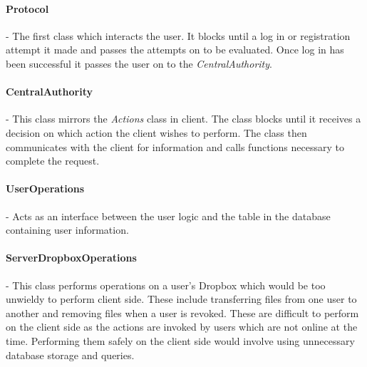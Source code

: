 \documentclass[12pt, titlepage]{article}
\begin{document}
\paragraph*{Protocol} - The first class which interacts the user. It blocks until a log in or registration attempt it made and passes the attempts on to be evaluated. Once log in has been successful it passes the user on to the \textit{CentralAuthority}.

\paragraph*{CentralAuthority} - This class mirrors the \textit{Actions} class in client. The class blocks until it receives a decision on which action the client wishes to perform. The class then communicates with the client for information and calls functions necessary to complete the request.
\paragraph*{UserOperations} - Acts as an interface between the user logic and the table in the database containing user information.

\paragraph*{ServerDropboxOperations} - This class performs operations on a user's Dropbox which would be too unwieldy to perform client side. These include transferring files from one user to another and removing files when a user is revoked. These are difficult to perform on the client side as the actions are invoked by users which are not online at the time. Performing them safely on the client side would involve using unnecessary database storage and queries.
\end{document}
